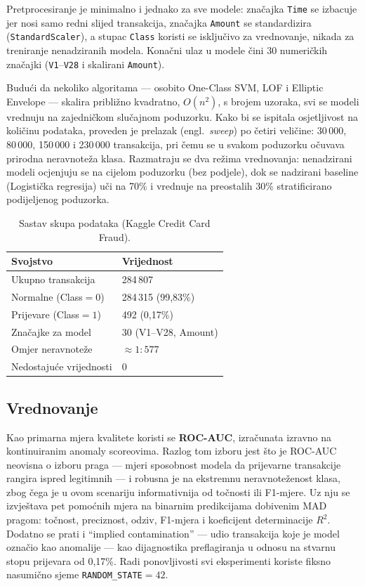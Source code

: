 \documentclass[letterpaper, 10pt, conference]{ieeeconf}
\begin{document}
Pretprocesiranje je minimalno i jednako za sve modele: značajka \texttt{Time} se izbacuje jer nosi samo redni slijed transakcija, značajka \texttt{Amount} se standardizira (\texttt{StandardScaler}), a stupac \texttt{Class} koristi se isključivo za vrednovanje, nikada za treniranje nenadziranih modela. Konačni ulaz u modele čini 30 numeričkih značajki (\texttt{V1}--\texttt{V28} i skalirani \texttt{Amount}).

Budući da nekoliko algoritama --- osobito One-Class SVM, LOF i Elliptic Envelope --- skalira približno kvadratno, $O(n^2)$, s brojem uzoraka, svi se modeli vrednuju na zajedničkom slučajnom poduzorku. Kako bi se ispitala osjetljivost na količinu podataka, proveden je prelazak (engl.\ \emph{sweep}) po četiri veličine: 30\,000, 80\,000, 150\,000 i 230\,000 transakcija, pri čemu se u svakom poduzorku očuvava prirodna neravnoteža klasa. Razmatraju se dva režima vrednovanja: nenadzirani modeli ocjenjuju se na cijelom poduzorku (bez podjele), dok se nadzirani baseline (Logistička regresija) uči na 70\% i vrednuje na preostalih 30\% stratificirano podijeljenog poduzorka.

\begin{table}[t]
\caption{Sastav skupa podataka (Kaggle Credit Card Fraud).}
\label{tab:dataset}
\centering
\begin{tabular}{@{}ll@{}}
\toprule
Svojstvo & Vrijednost \\
\midrule
Ukupno transakcija     & 284\,807 \\
Normalne (Class${=}0$) & 284\,315 (99,83\%) \\
Prijevare (Class${=}1$)& 492 (0,17\%) \\
Značajke za model      & 30 (V1--V28, Amount) \\
Omjer neravnoteže      & $\approx 1:577$ \\
Nedostajuće vrijednosti& 0 \\
\bottomrule
\end{tabular}
\end{table}

\subsection{Vrednovanje}

Kao primarna mjera kvalitete koristi se \textbf{ROC-AUC}, izračunata izravno na kontinuiranim anomaly scoreovima. Razlog tom izboru jest što je ROC-AUC neovisna o izboru praga --- mjeri sposobnost modela da prijevarne transakcije rangira ispred legitimnih --- i robusna je na ekstremnu neravnoteženost klasa, zbog čega je u ovom scenariju informativnija od točnosti ili F1-mjere. Uz nju se izvještava pet pomoćnih mjera na binarnim predikcijama dobivenim MAD pragom: točnost, preciznost, odziv, F1-mjera i koeficijent determinacije $R^2$. Dodatno se prati i ``implied contamination'' --- udio transakcija koje je model označio kao anomalije --- kao dijagnostika preflagiranja u odnosu na stvarnu stopu prijevara od 0,17\%. Radi ponovljivosti svi eksperimenti koriste fiksno nasumično sjeme \texttt{RANDOM\_STATE${=}42$}.
\end{document}
